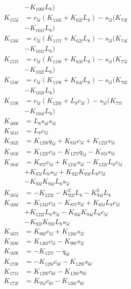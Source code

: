 \begin{multicols}{2}
\begin{align}
&- K_{100l}L_8) \nonumber \\
K_{155l} &= c_{5l}(K_{116l} + K_{62l}L_8) - s_{5l}(K_{73l}  \nonumber \\
&- K_{101l}L_8) \nonumber \\
K_{156l} &= c_{5l}(K_{117l} + K_{62l}L_8) - s_{5l}(K_{74l}  \nonumber \\
&- K_{101l}L_8) \nonumber \\
K_{157l} &= c_{5l}(K_{118l} + K_{63l}L_8) - s_{5l}(K_{75l}  \nonumber \\
&- K_{102l}L_8) \nonumber \\
K_{158l} &= c_{5l}(K_{119l} + K_{64l}L_8) - s_{5l}(K_{76l}  \nonumber \\
&- K_{103l}L_8) \nonumber \\
K_{159l} &= c_{5l}(K_{120l} + L_8c_{3l}) - s_{5l}(K_{77l}  \nonumber \\
&- K_{104l}L_8) \nonumber \\
K_{160l} &= L_8s_{4l}s_{5l} \nonumber \\
K_{161l} &= L_8c_{5l} \nonumber \\
K_{162l} &= K_{129l}\dot{q}_{5l} + K_{85l}c_{5l} + K_{122l}s_{5l} \nonumber \\
K_{163l} &= K_{122l}c_{5l} - K_{127l}\dot{q}_{5l} - K_{85l}s_{5l} \nonumber \\
K_{164l} &= K_{87l}c_{5l} + K_{124l}s_{5l} - K_{122l}L_8c_{5l}  \nonumber \\
&+ K_{85l}L_8s_{5l} + K_{92l}K_{93l}L_8c_{5l}  \nonumber \\
&- K_{93l}K_{94l}L_8s_{5l} \nonumber \\
K_{165l} &= - K_{123l} - K_{92l}^2L_8 - K_{94l}^2L_8 \nonumber \\
K_{166l} &= K_{124l}c_{5l} - K_{87l}s_{5l} + K_{85l}L_8c_{5l}  \nonumber \\
&+ K_{122l}L_8s_{5l} - K_{93l}K_{94l}L_8c_{5l}  \nonumber \\
&- K_{92l}K_{93l}L_8s_{5l} \nonumber \\
K_{167l} &= K_{90l}c_{5l} + K_{126l}s_{5l} \nonumber \\
K_{168l} &= K_{126l}c_{5l} - K_{90l}s_{5l} \nonumber \\
K_{169l} &= - K_{127l} - \dot{q}_{6l} \nonumber \\
K_{170l} &= - K_{128l}c_{6l} - K_{129l}s_{6l} \nonumber \\
K_{171l} &= K_{129l}c_{6l} - K_{128l}s_{6l} \nonumber \\
K_{172l} &= K_{95l}c_{6l} - K_{136l}s_{6l} \nonumber \\

\end{align}
\end{multicols}
